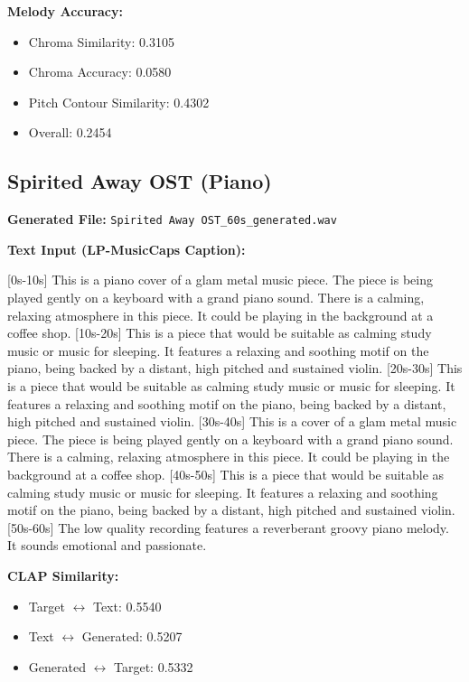 \documentclass{article}
\begin{document}
\textbf{Melody Accuracy:}
\begin{itemize}
    \item Chroma Similarity: 0.3105
    \item Chroma Accuracy: 0.0580
    \item Pitch Contour Similarity: 0.4302
    \item Overall: 0.2454
\end{itemize}

\subsection{Spirited Away OST (Piano)}

\textbf{Generated File:} \texttt{Spirited Away OST\_60s\_generated.wav}

\textbf{Text Input (LP-MusicCaps Caption):}

\small
[0s-10s] This is a piano cover of a glam metal music piece. The piece is being played gently on a keyboard with a grand piano sound. There is a calming, relaxing atmosphere in this piece. It could be playing in the background at a coffee shop. [10s-20s] This is a piece that would be suitable as calming study music or music for sleeping. It features a relaxing and soothing motif on the piano, being backed by a distant, high pitched and sustained violin. [20s-30s] This is a piece that would be suitable as calming study music or music for sleeping. It features a relaxing and soothing motif on the piano, being backed by a distant, high pitched and sustained violin. [30s-40s] This is a cover of a glam metal music piece. The piece is being played gently on a keyboard with a grand piano sound. There is a calming, relaxing atmosphere in this piece. It could be playing in the background at a coffee shop. [40s-50s] This is a piece that would be suitable as calming study music or music for sleeping. It features a relaxing and soothing motif on the piano, being backed by a distant, high pitched and sustained violin. [50s-60s] The low quality recording features a reverberant groovy piano melody. It sounds emotional and passionate.
\normalsize

\textbf{CLAP Similarity:}
\begin{itemize}
    \item Target $\leftrightarrow$ Text: 0.5540
    \item Text $\leftrightarrow$ Generated: 0.5207
    \item Generated $\leftrightarrow$ Target: 0.5332
\end{itemize}
\end{document}
